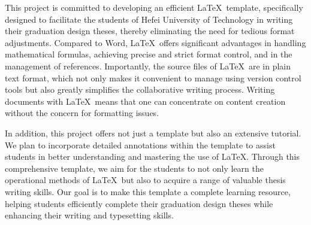\newcommand{\keywordsCn}[1][波导缝隙天线；低副瓣；阵列天线；宽边纵向缝]{#1}
\begin{abstract}
    
    随着雷达技术的不断发展，雷达系统广泛应用于军事、航空、航天、气象等领域，成为现代社会不可或缺的关键技术之一。天线作为雷达系统的核心组件，其性能直接影响着雷达系统的探测能力和精确度。波导缝隙阵列天线因其结构紧凑、制造简单、辐射效率高等优点，在雷达系统中得到了广泛应用。然而，副瓣水平过高会导致雷达系统的干扰和误警率增加，严重影响雷达系统的性能。因此，低副瓣天线成为当前研究的热点问题之一。其中波导缝隙天线口面分布相对于其他天线而言更容易控制，因此易于实现低副瓣性能，这使得它从各式天线中脱颖而出。
波导缝隙阵列同时保留了波导结构传输效率高、功率容量大、空间结构规则等诸多优良特性，因此在雷达天线设计中有着不可替代的地位。

    针对雷达系统中对高增益，低副瓣天线的需求，本文进行了以下研究工作:

    上述微波器件使用ANSYS HFSS软件进行建模，仿真与优化，分析了不同参数对天线性能的影响，并优化了天线结构，仿真结果表明，优化后的天线在满足低副瓣要求的同时，保证了较高的增益，且带宽性能较为良好。
\end{abstract}

\newcommand{\keywordsEn}[1][\LaTeX\ Template, HFUT, Tutorial]{#1}
\begin{abstractEn}
    This project is committed to developing an efficient \LaTeX\ template, specifically designed to facilitate the students of Hefei University of Technology in writing their graduation design theses, thereby eliminating the need for tedious format adjustments. Compared to Word, \LaTeX\ offers significant advantages in handling mathematical formulas, achieving precise and strict format control, and in the management of references. Importantly, the source files of \LaTeX\ are in plain text format, which not only makes it convenient to manage using version control tools but also greatly simplifies the collaborative writing process. Writing documents with \LaTeX\ means that one can concentrate on content creation without the concern for formatting issues.
    
    In addition, this project offers not just a template but also an extensive tutorial. We plan to incorporate detailed annotations within the template to assist students in better understanding and mastering the use of \LaTeX. Through this comprehensive template, we aim for the students to not only learn the operational methods of \LaTeX\ but also to acquire a range of valuable thesis writing skills. Our goal is to make this template a complete learning resource, helping students efficiently complete their graduation design theses while enhancing their writing and typesetting skills.
\end{abstractEn}